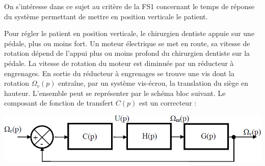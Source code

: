 On s'intéresse dans ce sujet au critère de la FS1 concernant le temps de réponse du système permettant de mettre en position verticale le patient. 

Pour régler le patient en position verticale, le chirurgien dentiste appuie sur une pédale, plus ou moins fort. Un moteur électrique se met en route, sa vitesse de rotation dépend de l'appui plus ou moins profond du chirurgien dentiste sur la pédale. La vitesse de rotation du moteur est diminuée par un réducteur à engrenages. En sortie du réducteur à engrenages se trouve une vis dont la rotation $\Omega_v(p)$ entraîne, par un système vis-écrou, la translation du siège en hauteur. L'ensemble peut se représenter par le schéma bloc suivant. Le composant de fonction de transfert $C(p)$ est un correcteur :


\begin{center}
\includegraphics[width=.6\textwidth]{png/fig3-dentaire}
\end{center}

